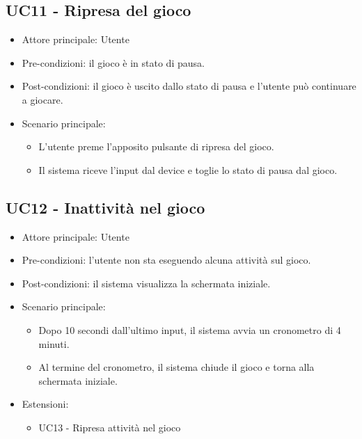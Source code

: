 \subsection{UC11 - Ripresa del gioco}
\begin{itemize}
    \item Attore principale: Utente
    \item Pre-condizioni: il gioco è in stato di pausa.
    \item Post-condizioni: il gioco è uscito dallo stato di pausa e l'utente può continuare a giocare.
    \item Scenario principale: \begin{itemize}
        \item L'utente preme l'apposito pulsante di ripresa del gioco.
        \item Il sistema riceve l'input dal device e toglie lo stato di pausa dal gioco.
    \end{itemize}
\end{itemize}

\subsection{UC12 - Inattività nel gioco}
\begin{itemize}
    \item Attore principale: Utente
    \item Pre-condizioni: l'utente non sta eseguendo alcuna attività sul gioco.
    \item Post-condizioni: il sistema visualizza la schermata iniziale.
    \item Scenario principale: \begin{itemize}
        \item Dopo 10 secondi dall'ultimo input, il sistema avvia un cronometro di 4 minuti.
        \item Al termine del cronometro, il sistema chiude il gioco e torna alla schermata iniziale.
    \end{itemize}
    \item Estensioni: \begin{itemize}
        \item UC13 - Ripresa attività nel gioco
    \end{itemize}
\end{itemize}

